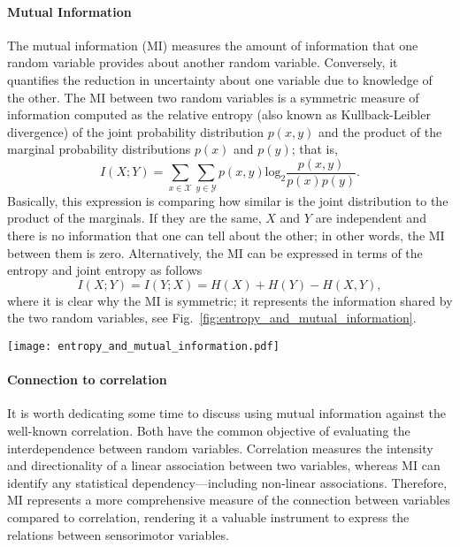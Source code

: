\paragraph*{Mutual Information}
The mutual information (MI) measures the amount of information that one random variable provides about another random variable. Conversely, it quantifies the reduction in uncertainty about one variable due to knowledge of the other. The MI between two random variables is a symmetric measure of information computed as the relative entropy (also known as Kullback-Leibler divergence) of the joint probability distribution $p\left(x,y\right)$ and the product of the marginal probability distributions $p\left(x\right)$ and $p\left(y\right)$; that is,
\begin{equation}\label{eq:mutual_information}
	I\left(X;Y\right) = \sum_{x \in \mathcal{X}}\sum_{y \in \mathcal{Y}}p\left(x,y\right) \text{log}_2\frac{p\left(x,y\right)}{p\left(x\right)p\left(y\right)}.
\end{equation}
Basically, this expression is comparing how similar is the joint distribution to the product of the marginals. If they are the same, $X$ and $Y$ are independent and there is no information that one can tell about the other; in other words, the MI between them is zero. Alternatively, the MI can be expressed in terms of the entropy and joint entropy as follows
\begin{equation}\label{eq:mutual_information}
	I\left(X;Y\right) =I\left(Y;X\right) = H(X) + H(Y) - H(X,Y),
\end{equation}
where it is clear why the MI is symmetric; it represents the information shared by the two random variables, see Fig.~\ref{fig:entropy_and_mutual_information}.
\begin{figure*}[!t]
	\centering	
	\hspace*{\fill}
	\texttt{[image: entropy\_and\_mutual\_information.pdf]}
	\hspace*{\fill}	
	\caption[] {\label{fig:entropy_and_mutual_information}\textbf{Relation between entropy and mutual information.} The mutual information between two variables expresses the amount of information that one variable contains about the to other.}
\end{figure*}
\paragraph*{Connection to correlation} It is worth dedicating some time to discuss using mutual information against the well-known correlation. Both have the common objective of evaluating the interdependence between random variables. Correlation measures the intensity and directionality of a linear association between two variables, whereas MI can identify any statistical dependency---including non-linear associations. Therefore, MI represents a more comprehensive measure of the connection between variables compared to correlation, rendering it a valuable instrument to express the relations between sensorimotor variables.

